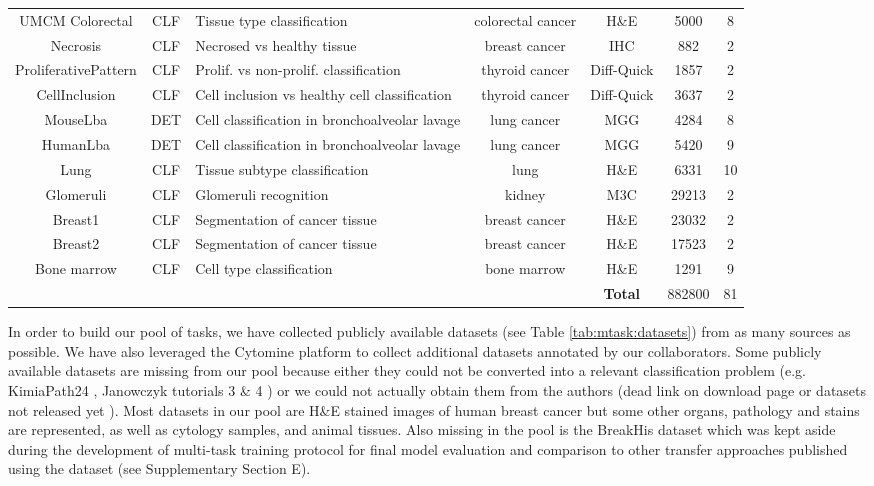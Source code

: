 \begin{table*}[t]
\begin{tabular}{|c|c|l|c|c|c|c|}
UMCM Colorectal \parencite{kather2016multi}  & CLF & Tissue type classification & colorectal cancer & H\&E& 5000 & 8 \\
Necrosis \parencite{mormont2018comparison}  & CLF &  Necrosed vs healthy tissue & breast cancer & IHC & 882 & 2 \\
ProliferativePattern \parencite{mormont2018comparison}  & CLF &  Prolif. vs non-prolif. classification & thyroid cancer & Diff-Quick & 1857 & 2 \\
CellInclusion \parencite{mormont2018comparison}  & CLF &  Cell inclusion vs healthy cell classification & thyroid cancer & Diff-Quick & 3637 & 2 \\
MouseLba \parencite{mormont2018comparison}  & DET &  Cell classification in bronchoalveolar lavage & lung cancer & MGG & 4284 & 8 \\
HumanLba \parencite{mormont2018comparison}  & DET &  Cell classification in bronchoalveolar lavage & lung cancer & MGG & 5420 & 9 \\
Lung \parencite{mormont2018comparison}  & CLF &  Tissue subtype classification & lung & H\&E & 6331 & 10 \\
Glomeruli \parencite{maree2016approach}  & CLF &  Glomeruli recognition & kidney & M3C & 29213 & 2 \\
Breast1 \parencite{mormont2018comparison}  & CLF & Segmentation of cancer tissue & breast cancer & H\&E & 23032 & 2 \\
Breast2 \parencite{mormont2018comparison}  & CLF & Segmentation of cancer tissue & breast cancer & H\&E & 17523 & 2 \\
Bone marrow \parencite{kainz2017training} & CLF & Cell type classification & bone marrow & H\&E & 1291 & 9 \\
        \hline 
\multicolumn{4}{|c|}{} & \textbf{Total} & 882800 & 81 \\
\hline
    \end{tabular}
\end{table*}

In order to build our pool of tasks, we have collected publicly available datasets (see Table \ref{tab:mtask:datasets}) from as many sources as possible. We have also leveraged the Cytomine \parencite{maree2016collaborative} platform to collect additional datasets annotated by our collaborators. Some publicly available datasets are missing from our pool because either they could not be converted into a relevant classification problem (e.g. KimiaPath24  \parencite{babaie2017classification}, Janowczyk tutorials 3 \& 4 \parencite{janowczyk2016deep}) or we could not actually obtain them from the authors (dead link on download page or datasets not released yet \parencite{gamper2019pannuke}). Most datasets in our pool are H\&E stained images of human breast cancer but some other organs, pathology and stains are represented, as well as cytology samples, and animal tissues. Also missing in the pool is the BreakHis \parencite{spanhol2015dataset} dataset which was kept aside during the development of multi-task training protocol for final model evaluation and comparison to other transfer approaches published using the dataset (see Supplementary Section E). 

